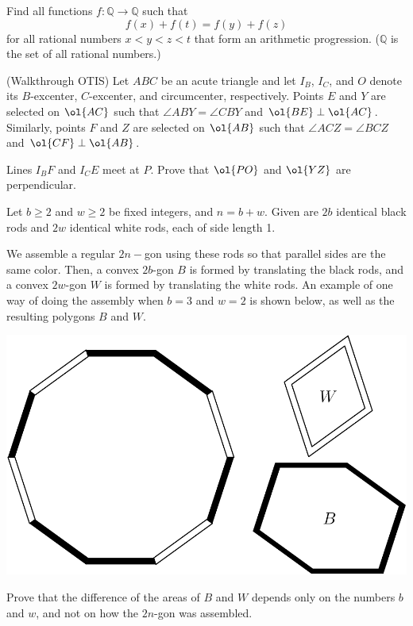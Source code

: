 \documentclass[11pt]{scrartcl}
\begin{document}
\begin{problem}
Find all functions $f:\mathbb{Q}\rightarrow\mathbb{Q}$ such that\[f(x)+f(t)=f(y)+f(z)\]for all rational numbers $x<y<z<t$ that form an arithmetic progression. ($\mathbb{Q}$ is the set of all rational numbers.)
\end{problem}
\begin{problem}[USAMO 2016/3]
  (Walkthrough OTIS)
  Let $ABC$ be an acute triangle
  and let $I_B$, $I_C$, and $O$ denote its
  $B$-excenter, $C$-excenter, and circumcenter, respectively.
  Points $E$ and $Y$ are selected on $\ol{AC}$ such that
  $\angle ABY = \angle CBY$ and $\ol{BE} \perp \ol{AC}$.
  Similarly, points $F$ and $Z$ are selected on $\ol{AB}$ such that
  $\angle ACZ = \angle BCZ$ and $\ol{CF} \perp \ol{AB}$.

  Lines $I_B F$ and $I_C E$ meet at $P$.
  Prove that $\ol{PO}$ and $\ol{YZ}$ are perpendicular.
\end{problem}
\begin{problem}[USAMO 2022/2]
    	Let $b\geq2$ and $w\geq2$ be fixed integers, and $n=b+w$. Given are $2b$ identical black rods and $2w$ identical white rods, each of side length 1.

We assemble a regular $2n-$gon using these rods so that parallel sides are the same color. Then, a convex $2b$-gon $B$ is formed by translating the black rods, and a convex $2w$-gon $W$ is formed by translating the white rods. An example of one way of doing the assembly when $b=3$ and $w=2$ is shown below, as well as the resulting polygons $B$ and $W$.

\begin{center}
\includegraphics[scale=0.5]{USAMO2022_2.png}
\end{center}
Prove that the difference of the areas of $B$ and $W$ depends only on the numbers $b$ and $w$, and not on how the $2n$-gon was assembled.
\end{problem}
\end{document}
